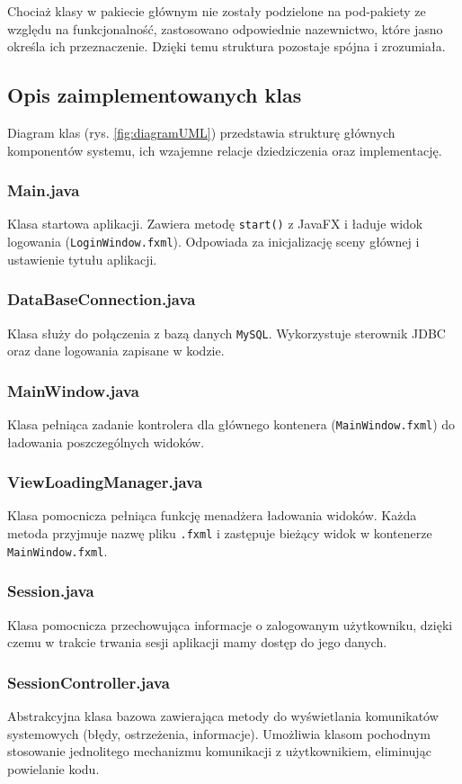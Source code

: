 Chociaż klasy w pakiecie głównym nie zostały podzielone na pod-pakiety ze względu na funkcjonalność, zastosowano odpowiednie nazewnictwo, które jasno określa ich przeznaczenie. Dzięki temu struktura pozostaje spójna i zrozumiała.

\subsection{Opis zaimplementowanych klas}

Diagram klas (rys. \ref{fig:diagramUML}) przedstawia strukturę głównych komponentów systemu, ich wzajemne relacje dziedziczenia oraz implementację. 
\subsubsection*{Main.java}
Klasa startowa aplikacji. Zawiera metodę \texttt{start()} z JavaFX i ładuje widok logowania (\texttt{LoginWindow.fxml}). Odpowiada za inicjalizację sceny głównej i ustawienie tytułu aplikacji.

\subsubsection*{DataBaseConnection.java}
Klasa służy do połączenia z bazą danych \texttt{MySQL}. Wykorzystuje sterownik JDBC oraz dane logowania zapisane w kodzie.

\subsubsection*{MainWindow.java}
Klasa pełniąca zadanie kontrolera dla głównego kontenera (\texttt{MainWindow.fxml}) do ładowania poszczególnych widoków.

\subsubsection*{ViewLoadingManager.java}
Klasa pomocnicza pełniąca funkcję menadżera ładowania widoków. Każda metoda przyjmuje nazwę pliku \texttt{.fxml} i zastępuje bieżący widok w kontenerze \texttt{MainWindow.fxml}.

\subsubsection*{Session.java}
Klasa pomocnicza przechowująca informacje o zalogowanym użytkowniku, dzięki czemu w trakcie trwania sesji aplikacji mamy dostęp do jego danych.

\subsubsection*{SessionController.java}
Abstrakcyjna klasa bazowa zawierająca metody do wyświetlania komunikatów systemowych (błędy, ostrzeżenia, informacje). Umożliwia klasom pochodnym stosowanie jednolitego mechanizmu komunikacji z użytkownikiem, eliminując powielanie kodu.

